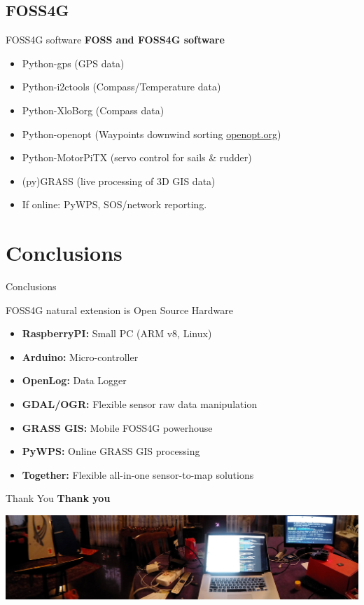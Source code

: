 \documentclass[aspectratio=169,unknownkeysallowed,xcolor=dvipsnames,beamer]{beamer} %
\begin{document}
\subsection{FOSS4G}
\begin{frame}[fragile]{FOSS4G software}
\textbf{FOSS and FOSS4G software}\\
\begin{itemize}
 \item Python-gps (GPS data)
 \item Python-i2ctools (Compass/Temperature data)
 \item Python-XloBorg (Compass data)
 \item Python-openopt (Waypoints downwind sorting \href{htp://openopt.org}{openopt.org})
 \item Python-MotorPiTX (servo control for sails \& rudder)
 \item (py)GRASS (live processing of 3D GIS data)
 \item If online: PyWPS, SOS/network reporting. 
\end{itemize}
\end{frame}


\section{Conclusions}
\begin{frame}[fragile]{Conclusions}

\begin{block}{FOSS4G natural extension is Open Source Hardware}
\begin{itemize}
 \item {\bf RaspberryPI:} Small PC (ARM v8, Linux) 
 \item {\bf Arduino:} Micro-controller
 \item {\bf OpenLog:} Data Logger
 \item {\bf GDAL/OGR:} Flexible sensor raw data manipulation
 \item {\bf GRASS GIS:} Mobile FOSS4G powerhouse
 \item {\bf PyWPS:} Online GRASS GIS processing 
 \item {\bf Together:} Flexible all-in-one sensor-to-map solutions
\end{itemize}
\end{block}

\end{frame}

\begin{frame}[fragile]{Thank You}
\textbf{Thank you}
\begin{center}
 \includegraphics[width=15cm]{pancam}
\end{center}
\end{frame}
\end{document}
